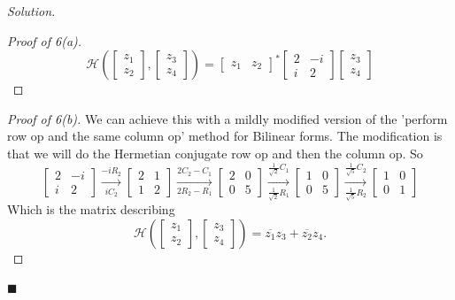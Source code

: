 \documentclass[11pt]{article}
\theoremstyle{plain}
\theoremstyle{definition}
\newenvironment{solution}{%
  \par\noindent\textit{Solution.}\
}{%
  \hfill$\blacksquare$\par\bigskip
}
\newcommand{\Herm}{\mathcal{H}}
\begin{document}
\begin{solution}
\begin{proof}[Proof of 6(a)]
    \[
      \Herm\left(
        \begin{bmatrix}
          z_1 \\
          z_2
        \end{bmatrix},
        \begin{bmatrix}
          z_3 \\
          z_4
      \end{bmatrix}\right)=
      \begin{bmatrix}
        z_1 & z_2
      \end{bmatrix}^*
      \begin{bmatrix}
        2 & -i \\
        i & 2
      \end{bmatrix}
      \begin{bmatrix}
        z_3 \\
        z_4
      \end{bmatrix}
    \]
  \end{proof}

  \begin{proof}[Proof of 6(b)]
    We can achieve this with a mildly modified version of the
    'perform row op and the same column op' method for Bilinear
    forms. The modification is that we will do the Hermetian
    conjugate row op and then the column op. So
    \[
      \begin{bmatrix}
        2 & -i \\
        i & 2
      \end{bmatrix}\xrightarrow[iC_2]{-iR_2}
      \begin{bmatrix}
        2 & 1 \\
        1 & 2
      \end{bmatrix}\xrightarrow[2R_2 - R_1]{2C_2-C_1}
      \begin{bmatrix}
        2 & 0 \\
        0 & 5
      \end{bmatrix}\xrightarrow[\frac{1}{\sqrt{2}}R_1]{\frac{1}{\sqrt{2}}C_1}
      \begin{bmatrix}
        1 & 0 \\
        0 & 5
      \end{bmatrix}\xrightarrow[\frac{1}{\sqrt{5}}R_2]{\frac{1}{\sqrt{5}}C_2}
      \begin{bmatrix}
        1 & 0 \\
        0 & 1
      \end{bmatrix}
    \]
    Which is the matrix describing
    \[
      \Herm\!\left(
        \begin{bmatrix} z_1 \\ z_2
        \end{bmatrix},
        \begin{bmatrix} z_3 \\ z_4
      \end{bmatrix}\right)
      = \overline{z_1} z_3 + \overline{z_2} z_4.
    \]
  \end{proof}


\end{solution}
\end{document}
